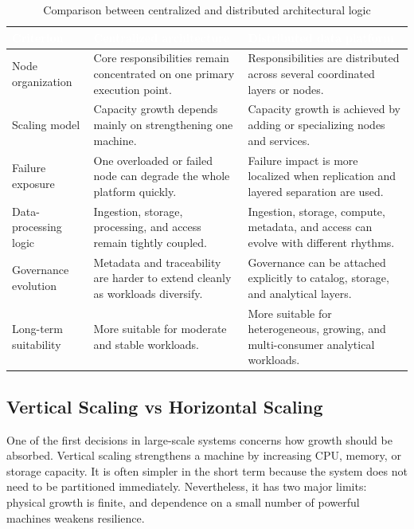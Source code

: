 \begin{table}[H]
    \centering
    \footnotesize
    \renewcommand{\arraystretch}{1.25}
    \begin{tabularx}{\textwidth}{|L{3.0cm}|Y|Y|}
        \hline
        \textcolor{white}{\textbf{Criterion}} & \textcolor{white}{\textbf{Centralized architecture}} & \textcolor{white}{\textbf{Distributed data platform}} \\
        \hline
        Node organization & Core responsibilities remain concentrated on one primary execution point. & Responsibilities are distributed across several coordinated layers or nodes. \\
        \hline
        Scaling model & Capacity growth depends mainly on strengthening one machine. & Capacity growth is achieved by adding or specializing nodes and services. \\
        \hline
        Failure exposure & One overloaded or failed node can degrade the whole platform quickly. & Failure impact is more localized when replication and layered separation are used. \\
        \hline
        Data-processing logic & Ingestion, storage, processing, and access remain tightly coupled. & Ingestion, storage, compute, metadata, and access can evolve with different rhythms. \\
        \hline
        Governance evolution & Metadata and traceability are harder to extend cleanly as workloads diversify. & Governance can be attached explicitly to catalog, storage, and analytical layers. \\
        \hline
        Long-term suitability & More suitable for moderate and stable workloads. & More suitable for heterogeneous, growing, and multi-consumer analytical workloads. \\
        \hline
    \end{tabularx}
    \caption{Comparison between centralized and distributed architectural logic}
    \label{tab:centralized-vs-distributed}
\end{table}

\subsection{Vertical Scaling vs Horizontal Scaling}
One of the first decisions in large-scale systems concerns how growth should be absorbed. Vertical scaling strengthens a machine by increasing CPU, memory, or storage capacity. It is often simpler in the short term because the system does not need to be partitioned immediately. Nevertheless, it has two major limits: physical growth is finite, and dependence on a small number of powerful machines weakens resilience.

